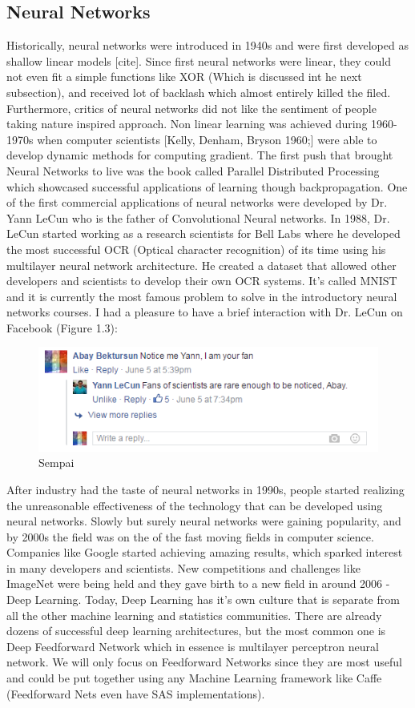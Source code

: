\documentclass[paper=a4, fontsize=11pt]{scrartcl}
\numberwithin{equation}{section}		%
\numberwithin{figure}{section}			%
\numberwithin{table}{section}			%
\begin{document}
	\subsection{Neural Networks}
	Historically, neural networks were introduced in 1940s and were first developed as shallow linear models [cite]. Since first neural networks were linear, they could not even fit a simple functions like XOR (Which is discussed int he next subsection), and received lot of backlash which almost entirely killed the filed. Furthermore, critics of neural networks did not like the sentiment of people taking nature inspired approach. Non linear learning was achieved during 1960-1970s when computer scientists [Kelly, Denham, Bryson 1960;] were able to develop dynamic methods for computing gradient.
	The first push that brought Neural Networks to live was the book called Parallel Distributed Processing which showcased successful applications of learning though backpropagation.
	One of the first commercial applications of neural networks were developed by Dr. Yann LeCun who is the father of Convolutional Neural networks. In 1988, Dr. LeCun started working as a research scientists for Bell Labs where he developed the most successful OCR (Optical character recognition) of its time using his multilayer neural network architecture. He created a dataset that allowed other developers and scientists to develop their own OCR systems. It's called MNIST and it is currently the most famous problem to solve in the introductory neural networks courses. I had a pleasure to  have a brief interaction with Dr. LeCun on Facebook (Figure 1.3):
	\begin{figure}[!htb]
		\centering
		\includegraphics[scale=0.55]{sempai.PNG}
		\caption{Sempai}
		\label{fig:sempai}
	\end{figure}
	\newline After industry had the taste of neural networks in 1990s, people started realizing the unreasonable effectiveness of the technology that can be developed using neural networks. Slowly but surely neural networks were gaining popularity, and by 2000s the field was on the of the fast moving fields in computer science. Companies like Google started achieving amazing results, which sparked interest in many developers and scientists. New competitions and challenges like ImageNet were being held and they gave birth to a new field in around 2006 - Deep Learning. Today, Deep Learning has it's own culture that is separate from all the other machine learning and statistics communities. There are already dozens of successful deep learning architectures, but the most common one is Deep Feedforward Network which in essence is multilayer perceptron neural network. We will only focus on Feedforward Networks since they are most useful and could be put together using any Machine Learning framework like Caffe (Feedforward Nets even have SAS implementations).
\end{document}
